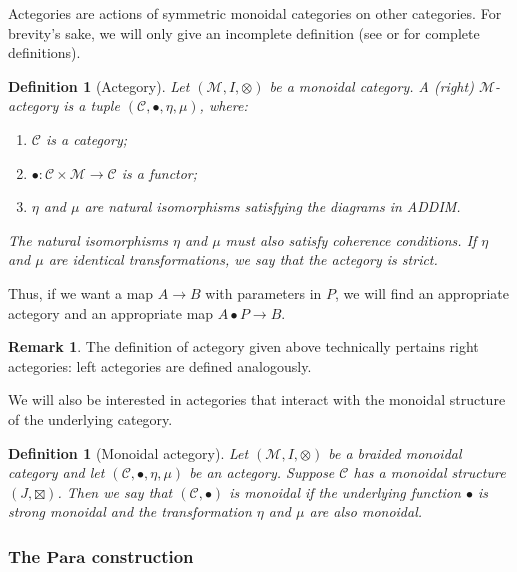 \documentclass[12pt,a4paper,openright,twoside]{report}
\theoremstyle{plain}
\newtheorem{definition}[proposition]{Definition}
\theoremstyle{definition}
\newtheorem{remark}[proposition]{Remark}
\begin{document}
Actegories are actions of symmetric monoidal categories on other categories. For brevity's sake, we will only give an incomplete definition (see \cite{capucci2022actegories} or \cite{gavranovic2024fundamental} for complete definitions).

\begin{definition}[Actegory]
  Let $(\mathcal{M},I,\otimes)$ be a monoidal category. A (right) $\mathcal{M}$-actegory is a tuple $(\mathcal{C}, \bullet, \eta, \mu)$, where:
  \begin{enumerate}
    \item $\mathcal{C}$ is a category;
    \item $\bullet: \mathcal{C} \times \mathcal{M} \to \mathcal{C}$ is a functor;
    \item $\eta$ and $\mu$ are natural isomorphisms satisfying the diagrams in ADDIM.
  \end{enumerate}
  The natural isomorphisms $\eta$ and $\mu$ must also satisfy coherence conditions. If $\eta$ and $\mu$ are identical transformations, we say that the actegory is strict.
\end{definition}

Thus, if we want a map $A \to B$ with parameters in $P$, we will find an appropriate actegory and an appropriate map $A \bullet P \to B$.

\begin{remark}
  The definition of actegory given above technically pertains right actegories: left actegories are defined analogously.
\end{remark}

We will also be interested in actegories that interact with the monoidal structure of the underlying category.

\begin{definition}[Monoidal actegory]
  Let $(\mathcal{M},I,\otimes)$ be a braided monoidal category and let $(\mathcal{C}, \bullet, \eta, \mu)$ be an actegory. Suppose $\mathcal{C}$ has a monoidal structure $(J,\boxtimes)$. Then we say that $(\mathcal{C}, \bullet)$ is monoidal if the underlying function $\bullet$ is strong monoidal and the transformation $\eta$ and $\mu$ are also monoidal.
\end{definition}



\subsubsection{The $\mathbf{Para}$ construction}
\end{document}
